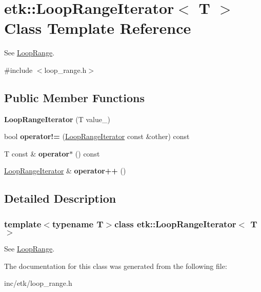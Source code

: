 \hypertarget{classetk_1_1_loop_range_iterator}{\section{etk\-:\-:Loop\-Range\-Iterator$<$ T $>$ Class Template Reference}
\label{classetk_1_1_loop_range_iterator}
}


See \hyperlink{classetk_1_1_loop_range}{Loop\-Range}.  




{\ttfamily \#include $<$loop\-\_\-range.\-h$>$}

\subsection*{Public Member Functions}
\begin{DoxyCompactItemize}
\item 
\hypertarget{classetk_1_1_loop_range_iterator_a6559a8dcd8ea01fe67b69e8716771ebc}{{\bfseries Loop\-Range\-Iterator} (T value\-\_\-)}\label{classetk_1_1_loop_range_iterator_a6559a8dcd8ea01fe67b69e8716771ebc}

\item 
\hypertarget{classetk_1_1_loop_range_iterator_add28a9e609904709987b8f8d88731b99}{bool {\bfseries operator!=} (\hyperlink{classetk_1_1_loop_range_iterator}{Loop\-Range\-Iterator} const \&other) const }\label{classetk_1_1_loop_range_iterator_add28a9e609904709987b8f8d88731b99}

\item 
\hypertarget{classetk_1_1_loop_range_iterator_a9612432cc32c5cf1a201cf031d43b714}{T const \& {\bfseries operator$\ast$} () const }\label{classetk_1_1_loop_range_iterator_a9612432cc32c5cf1a201cf031d43b714}

\item 
\hypertarget{classetk_1_1_loop_range_iterator_a71e1ca761e2f6abd5bb412e5065e8139}{\hyperlink{classetk_1_1_loop_range_iterator}{Loop\-Range\-Iterator} \& {\bfseries operator++} ()}\label{classetk_1_1_loop_range_iterator_a71e1ca761e2f6abd5bb412e5065e8139}

\end{DoxyCompactItemize}


\subsection{Detailed Description}
\subsubsection*{template$<$typename T$>$class etk\-::\-Loop\-Range\-Iterator$<$ T $>$}

See \hyperlink{classetk_1_1_loop_range}{Loop\-Range}. 

The documentation for this class was generated from the following file\-:\begin{DoxyCompactItemize}
\item 
inc/etk/loop\-\_\-range.\-h\end{DoxyCompactItemize}
